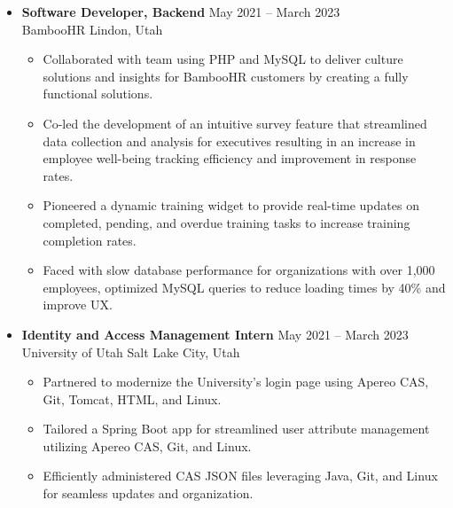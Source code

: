\documentclass[letterpaper,1pt]{article}
\begin{document}
\begin{itemize}[leftmargin=0.15in, itemsep=0pt, parsep=0pt, label={}]
  \item{
              \textbf{Software Developer, Backend} \hfill May 2021 -- March 2023 \\
              BambooHR \hfill Lindon, Utah \\
              \begin{itemize}
                \item{Collaborated with team using PHP and MySQL to deliver culture solutions and insights for BambooHR customers by creating a fully functional solutions.}
                \item{Co-led the development of an intuitive survey feature that streamlined data collection and analysis for executives resulting in an increase in employee well-being tracking efficiency and improvement in response rates.}
                \item{Pioneered a dynamic training widget to provide real-time updates on completed, pending, and overdue training tasks to increase training completion rates.}
                \item{Faced with slow database performance for organizations with over 1,000 employees, optimized MySQL queries to reduce loading times by 40\% and improve UX.}
              \end{itemize}
        }

  \item{
              \textbf{Identity and Access Management Intern} \hfill May 2021 -- March 2023 \\
              University of Utah \hfill Salt Lake City, Utah \\
              \begin{itemize}
                \item{Partnered to modernize the University’s login page using Apereo CAS, Git, Tomcat, HTML, and Linux.}
                \item{Tailored a Spring Boot app for streamlined user attribute management utilizing Apereo CAS, Git, and Linux.}
                \item{ Efficiently administered CAS JSON files leveraging Java, Git, and Linux for seamless updates and organization.}
              \end{itemize}
        }


\end{itemize}
\end{document}
